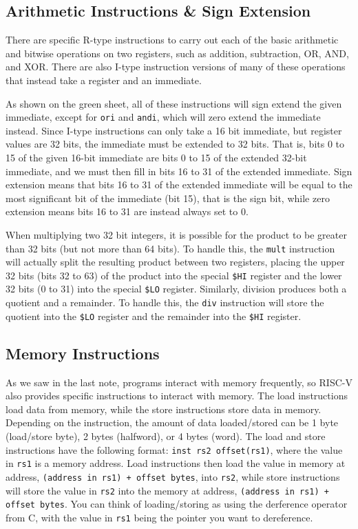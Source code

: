 \documentclass{article}
\begin{document}
\subsection{Arithmetic Instructions \& Sign Extension}
There are specific R-type instructions to carry out each of the basic arithmetic and bitwise operations on two registers, such as addition, subtraction, OR, AND, and XOR. There are also I-type instruction versions of many of these operations that instead take a register and an immediate. 

As shown on the green sheet, all of these instructions will sign extend the given immediate, except for \texttt{ori} and \texttt{andi}, which will zero extend the immediate instead. Since I-type instructions can only take a 16 bit immediate, but register values are 32 bits, the immediate must be extended to 32 bits. That is, bits 0 to 15 of the given 16-bit immediate are bits 0 to 15 of the extended 32-bit immediate, and we must then fill in bits 16 to 31 of the extended immediate. Sign extension means that bits 16 to 31 of the extended immediate will be equal to the most significant bit of the immediate (bit 15), that is the sign bit, while zero extension means bits 16 to 31 are instead always set to 0.

When multiplying two 32 bit integers, it is possible for the product to be greater than 32 bits (but not more than 64 bits). To handle this, the \texttt{mult} instruction will actually split the resulting product between two registers, placing the upper 32 bits (bits 32 to 63) of the product into the special \texttt{\$HI} register and the lower 32 bits (0 to 31) into the special \texttt{\$LO} register. Similarly, division produces both a quotient and a remainder. To handle this, the \texttt{div} instruction will store the quotient into the \texttt{\$LO} register and the remainder into the \texttt{\$HI} register.

\subsection{Memory Instructions}
As we saw in the last note, programs interact with memory frequently, so RISC-V also provides specific instructions to interact with memory. The load instructions load data from memory, while the store instructions store data in memory. Depending on the instruction, the amount of data loaded/stored can be 1 byte (load/store byte), 2 bytes (halfword), or 4 bytes (word). The load and store instructions have the following format: \texttt{inst rs2 offset(rs1)}, where the value in \texttt{rs1} is a memory address. Load instructions then load the value in memory at address, \texttt{(address in rs1) + offset bytes}, into \texttt{rs2}, while store instructions will store the value in \texttt{rs2} into the memory at address, \texttt{(address in rs1) + offset bytes}. You can think of loading/storing as using the derference operator from C, with the value in \texttt{rs1} being the pointer you want to dereference.
\end{document}
